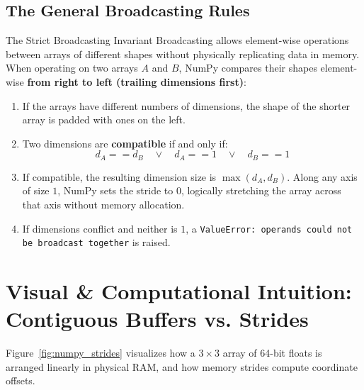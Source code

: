 \subsection{The General Broadcasting Rules}

\begin{theorembox}{The Strict Broadcasting Invariant}
Broadcasting allows element-wise operations between arrays of different shapes without physically replicating data in memory.
When operating on two arrays $A$ and $B$, NumPy compares their shapes element-wise \textbf{from right to left (trailing dimensions first)}:
\begin{enumerate}
    \item If the arrays have different numbers of dimensions, the shape of the shorter array is padded with ones on the left.
    \item Two dimensions are \textbf{compatible} if and only if:
    \begin{equation}
    d_A == d_B \quad \lor \quad d_A == 1 \quad \lor \quad d_B == 1
    \end{equation}
    \item If compatible, the resulting dimension size is $\max(d_A, d_B)$. Along any axis of size $1$, NumPy sets the stride to $0$, logically stretching the array across that axis without memory allocation.
    \item If dimensions conflict and neither is $1$, a \texttt{ValueError: operands could not be broadcast together} is raised.
\end{enumerate}
\end{theorembox}

\section{Visual \& Computational Intuition: Contiguous Buffers vs. Strides}

Figure~\ref{fig:numpy_strides} visualizes how a $3 \times 3$ array of 64-bit floats is arranged linearly in physical RAM, and how memory strides compute coordinate offsets.

